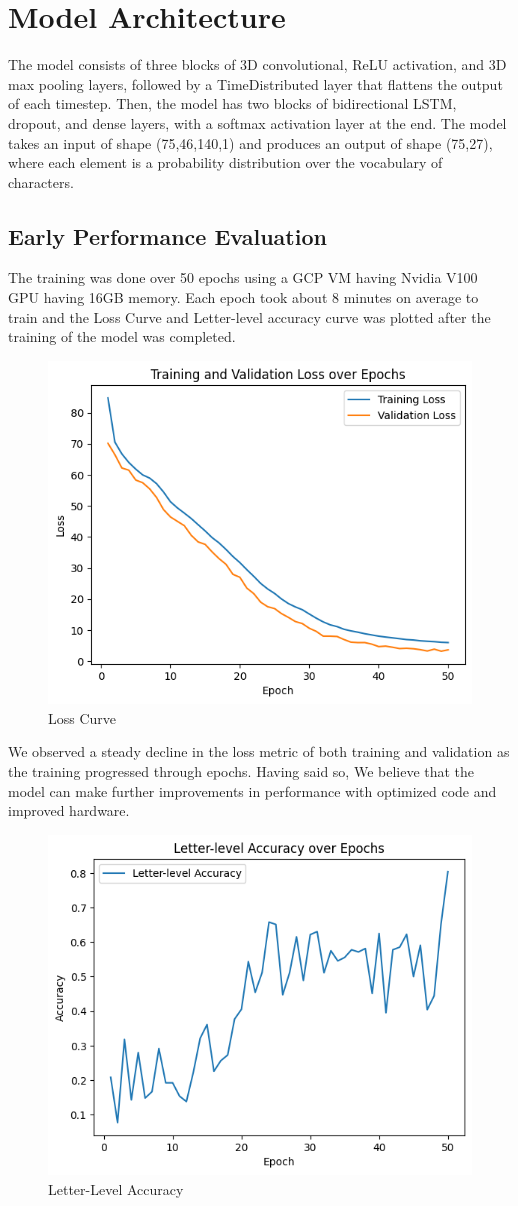     \section{Model Architecture}
    The model consists of three blocks of 3D convolutional, ReLU activation, and 3D max pooling layers, followed by a TimeDistributed layer that flattens the output of each timestep. Then, the model has two blocks of bidirectional LSTM, dropout, and dense layers, with a softmax activation layer at the end. The model takes an input of shape (75,46,140,1) and produces an output of shape (75,27), where each element is a probability distribution over the vocabulary of characters.


\subsection{Early Performance Evaluation}
 The training was done over 50 epochs using a GCP VM having Nvidia V100 GPU having 16GB memory. Each epoch took about 8 minutes on average to train and the Loss Curve and Letter-level accuracy curve was plotted after the training of the model was completed.
    \begin{figure}[h]
	\centering
	\includegraphics[width=0.6\linewidth]{img/loss.png}
	\caption{Loss Curve}
	
	\end{figure}

We observed a steady decline in the loss metric of both training and validation as the training progressed through epochs. Having said so, We believe that the model can make further improvements in performance with optimized code and improved hardware.
\pagebreak
\begin{figure}[h]
	\centering
	\includegraphics[width=0.6\linewidth]{img/accuracy.png}
	\caption{Letter-Level Accuracy}
	
	\end{figure}


